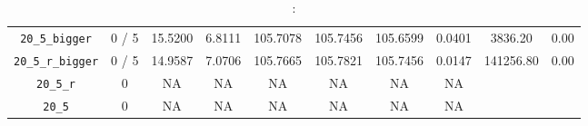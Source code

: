 \documentclass{scrartcl}
\begin{document}
\begin{table}[h!]
\begin{center}
\begin{tabular}{| c | c | c | c | c | c | c | c | c | c |}
\verb|20_5_bigger| & 0 / 5 & 15.5200 & 6.8111 & 105.7078 & 105.7456 & 105.6599 & 0.0401 & 3836.20 & 0.00\\ 
\verb|20_5_r_bigger| & 0 / 5 & 14.9587 & 7.0706 & 105.7665 & 105.7821 & 105.7456 & 0.0147 & 141256.80 & 0.00\\ 
\verb|20_5_r| & 0 & NA & NA & NA & NA & NA & NA & \\ 
\verb|20_5| & 0 & NA & NA & NA & NA & NA & NA & \\ 
\hline
\end{tabular}
\caption{:}
\label{table:}
\end{center}
\end{table}
\end{document}
